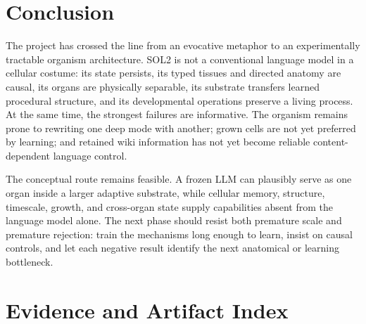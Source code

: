 \documentclass[11pt]{article}
\newcommand{\soltwo}{\textsf{SOL2}}
\begin{document}
\section{Conclusion}

The project has crossed the line from an evocative metaphor to an experimentally
tractable organism architecture. \soltwo{} is not a conventional language model in a
cellular costume: its state persists, its typed tissues and directed anatomy are causal,
its organs are physically separable, its substrate transfers learned procedural
structure, and its developmental operations preserve a living process. At the same
time, the strongest failures are informative. The organism remains prone to rewriting
one deep mode with another; grown cells are not yet preferred by learning; and retained
wiki information has not yet become reliable content-dependent language control.

The conceptual route remains feasible. A frozen LLM can plausibly serve as one organ
inside a larger adaptive substrate, while cellular memory, structure, timescale, growth,
and cross-organ state supply capabilities absent from the language model alone. The next
phase should resist both premature scale and premature rejection: train the mechanisms
long enough to learn, insist on causal controls, and let each negative result identify
the next anatomical or learning bottleneck.

\appendix
\section{Evidence and Artifact Index}
\end{document}
